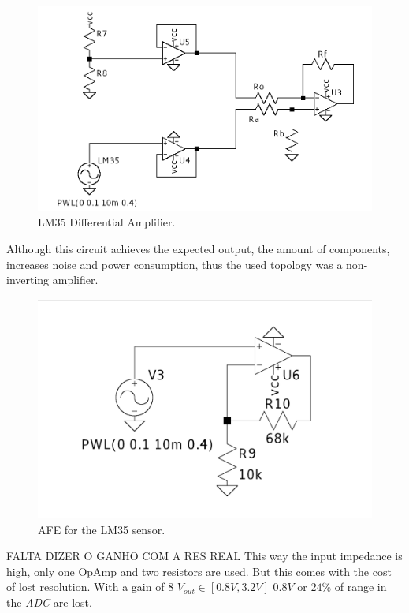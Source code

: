 \documentclass[12pt]{article}
\begin{document}
    \begin{figure}[H] 
        \centering
        \includegraphics*[scale = 0.3]{images/DiffAmpLM35.png}
        \caption{LM35 Differential Amplifier.}
        \label{wrap-fig:1}
    \end{figure}

    Although this circuit achieves the expected output, the amount of components,
    increases noise and power consumption, thus the used topology was a non-inverting amplifier.

    \begin{figure}[H] 
        \centering
        \includegraphics*[scale = 0.2]{images/AFELM35.png}
        \caption{AFE for the LM35 sensor.}
        \label{AFELM35}
    \end{figure}

    FALTA DIZER O GANHO COM A RES REAL
    This way the input impedance is high, only one OpAmp and two resistors are used.
    But this comes with the cost of lost resolution. With a gain of $8$ $V_{out}\in[0.8V,3.2V]$
    $0.8V$ or $24\%$ of range in the \textit{ADC} are lost.
\end{document}
